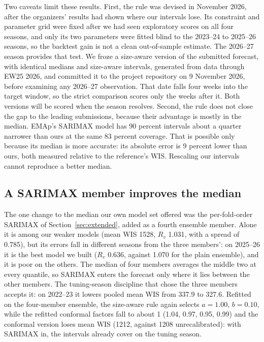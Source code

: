 \documentclass[11pt]{article}
\begin{document}
Two caveats limit these results. First, the rule was devised in November 2026, after the
organizers' results had shown where our intervals lose. Its constraint and parameter grid were
fixed after we had seen exploratory scores on all four seasons, and only its two parameters were
fitted blind to the 2023--24 to 2025--26 seasons, so the backtest gain is not a clean
out-of-sample estimate. The 2026--27 season provides that test. We froze a size-aware version of
the submitted forecast, with identical medians and size-aware intervals, generated from data
through EW25 2026, and committed it to the project repository on 9 November 2026, before examining
any 2026--27 observation. That date falls four weeks into the target window, so the strict
comparison scores only the weeks after it. Both versions will be scored when the season resolves.
Second, the rule
does not close the gap to the leading submissions, because their advantage is mostly in the median.
EMAp's SARIMAX model has 90 percent intervals about a quarter narrower than ours at the same
83 percent coverage. That is possible only because its median is more accurate: its absolute error
is 9 percent lower than ours, both measured relative to the reference's WIS. Rescaling our intervals
cannot reproduce a better median.

\subsection{A SARIMAX member improves the median}\label{sec:sarimaxmember}
The one change to the median our own model set offered was the per-fold-order SARIMAX of
Section~\ref{sec:extended}, added as a fourth ensemble member. Alone it is among our weaker models
(mean WIS 1528, $R_v$ 1.031, with a spread of 0.785), but its errors fall in different seasons from
the three members': on 2025--26 it is the best model we built ($R_v$ 0.636, against 1.070 for the
plain ensemble), and it is poor on the others. The median of four members averages the middle two
at every quantile, so SARIMAX enters the forecast only where it lies between the other members.
The tuning-season discipline that chose the three members accepts it: on
2022--23 it lowers pooled mean WIS from 337.9 to 327.6. Refitted on the four-member ensemble, the
size-aware rule again selects $a=1.00$, $b=0.10$, while the refitted conformal factors fall to
about 1 (1.04, 0.97, 0.95, 0.99) and the conformal version loses mean WIS (1212, against 1208
unrecalibrated): with SARIMAX in, the intervals already cover on the tuning season.
\end{document}
